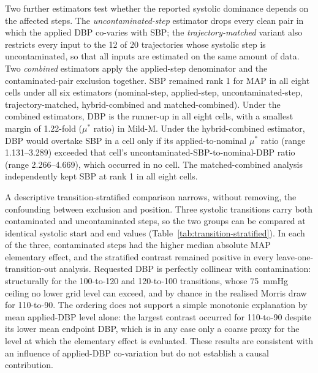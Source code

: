 \documentclass[pdflatex,sn-nature]{sn-jnl}%
\begin{document}
Two further estimators test whether the reported systolic dominance depends on the affected steps. The \emph{uncontaminated-step} estimator drops every clean pair in which the applied DBP co-varies with SBP; the \emph{trajectory-matched} variant also restricts every input to the 12 of 20 trajectories whose systolic step is uncontaminated, so that all inputs are estimated on the same amount of data. Two \emph{combined} estimators apply the applied-step denominator and the contaminated-pair exclusion together. SBP remained rank 1 for MAP in all eight cells under all six estimators (nominal-step, applied-step, uncontaminated-step, trajectory-matched, hybrid-combined and matched-combined). Under the combined estimators, DBP is the runner-up in all eight cells, with a smallest margin of 1.22-fold ($\mu^{*}$ ratio) in Mild-M. Under the hybrid-combined estimator, DBP would overtake SBP in a cell only if its applied-to-nominal $\mu^{*}$ ratio (range 1.131--3.289) exceeded that cell's uncontaminated-SBP-to-nominal-DBP ratio (range 2.266--4.669), which occurred in no cell. The matched-combined analysis independently kept SBP at rank 1 in all eight cells.

A descriptive transition-stratified comparison narrows, without removing, the confounding between exclusion and position. Three systolic transitions carry both contaminated and uncontaminated steps, so the two groups can be compared at identical systolic start and end values (Table~\ref{tab:transition-stratified}). In each of the three, contaminated steps had the higher median absolute MAP elementary effect, and the stratified contrast remained positive in every leave-one-transition-out analysis. Requested DBP is perfectly collinear with contamination: structurally for the 100-to-120 and 120-to-100 transitions, whose 75~mmHg ceiling no lower grid level can exceed, and by chance in the realised Morris draw for 110-to-90. The ordering does not support a simple monotonic explanation by mean applied-DBP level alone: the largest contrast occurred for 110-to-90 despite its lower mean endpoint DBP, which is in any case only a coarse proxy for the level at which the elementary effect is evaluated. These results are consistent with an influence of applied-DBP co-variation but do not establish a causal contribution.
\end{document}
